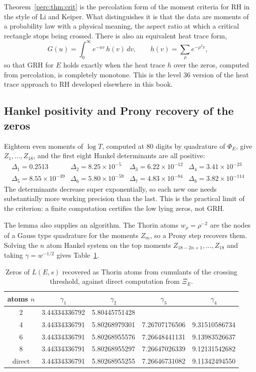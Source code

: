 Theorem~\ref{perc:thm:crit} is the percolation form of the moment criteria for RH in the style of Li and Keiper. What distinguishes it is that the data are moments of a probability law with a physical meaning, the aspect ratio at which a critical rectangle stops being crossed. There is also an equivalent heat trace form,
\[
G(u) = \int_0^\infty e^{-uv}\,h(v)\,dv,\qquad h(v) = \sum_\rho e^{-\rho^2v},
\]
so that GRH for $E$ holds exactly when the heat trace $h$ over the zeros, computed from percolation, is completely monotone. This is the level 36 version of the heat trace approach to RH developed elsewhere in this book.

\subsection{Hankel positivity and Prony recovery of the zeros}

Eighteen even moments of $\log T$, computed at 80 digits by quadrature of $\Phi_E$, give $Z_1,\dots,Z_{18}$, and the first eight Hankel determinants are all positive:
\[
\begin{array}{cccc}
\Delta_1 = 0.2513 & \Delta_2 = 8.25\times10^{-5} & \Delta_3 = 6.22\times10^{-12} & \Delta_4 = 3.41\times10^{-23}\\
\Delta_5 = 8.55\times10^{-39} & \Delta_6 = 5.80\times10^{-59} & \Delta_7 = 4.83\times10^{-84} & \Delta_8 = 3.82\times10^{-114}
\end{array}
\]
The determinants decrease super exponentially, so each new one needs substantially more working precision than the last. This is the practical limit of the criterion: a finite computation certifies the low lying zeros, not GRH.

The lemma also supplies an algorithm. The Thorin atoms $w_\rho = \rho^{-2}$ are the nodes of a Gauss type quadrature for the moments $Z_m$, so a Prony step recovers them. Solving the $n$ atom Hankel system on the top moments $Z_{18-2n+1},\dots,Z_{18}$ and taking $\gamma = w^{-1/2}$ gives Table~\ref{perc:tab:prony}.

\begin{table}[h]
\centering
\begin{tabular}{ccccc}
\toprule
atoms $n$ & $\gamma_1$ & $\gamma_2$ & $\gamma_3$ & $\gamma_4$\\
\midrule
2 & 3.44334336792 & 5.80445751428 & & \\
4 & 3.44334336791 & 5.80268979301 & 7.26707176506 & 9.31510586734\\
6 & 3.44334336791 & 5.80268955576 & 7.26648441131 & 9.13983526637\\
8 & 3.44334336791 & 5.80268955297 & 7.26647026339 & 9.12131542682\\
\midrule
direct & 3.44334336791 & 5.80268955255 & 7.26646731082 & 9.11342494550\\
\bottomrule
\end{tabular}
\caption{Zeros of $L(E,s)$ recovered as Thorin atoms from cumulants of the crossing threshold, against direct computation from $\Xi_E$.}
\label{perc:tab:prony}
\end{table}

